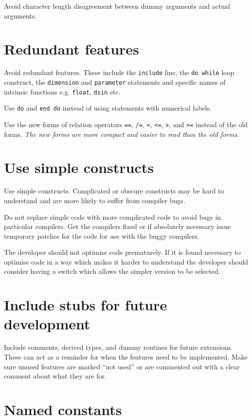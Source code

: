\documentclass[11pt,twoside,a4paper]{report}
\begin{document}
Avoid  character length disagreement between dummy arguments
and actual arguments.

\section{Redundant features}

Avoid redundant features. These include the \verb|include| line, the
\verb|do while| loop construct, the \verb|dimension| and
\verb|parameter| statements and specific names of intrinsic functions
e.g. \verb|float|, \verb|dsin| etc.

Use \verb|do| and \verb|end do| instead of using statements with
numerical labels. 

Use the new forms of relation operators \verb|==|, \verb|/=|,
\verb|<|, \verb|<=|, \verb|>|, and \verb|>=| instead of the old
forms. {\it The new forms are more compact and easier to read than the 
  old forms}.

\section{Use simple constructs}

Use simple constructs. Complicated or obscure constructs
may be hard to understand and are more likely to suffer from compiler
bugs. 

Do not replace simple code with more complicated
code to avoid bugs in particular compilers.
Get the compilers fixed or if absolutely necessary issue temporary
patches for the code for use with the buggy compilers.


The developer should not optimise code prematurely. If it is found
necessary to optimise code in a way which makes it harder to
understand the developer should consider having a switch which
allows the simpler version to be selected.

\section{Include stubs for future development}

Include comments, derived types, and dummy routines for future
extensions. These can act as a reminder for when the features need 
to be implemented. Make sure unused features are marked ``not used''
or are commented out with a clear comment about what they are for.

\section{Named constants}
\end{document}
